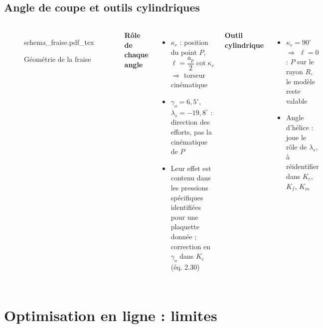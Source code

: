 \subsection*{Angle de coupe et outils cylindriques}
\begin{frame}

    \begin{columns}[c]
        \begin{figure}
            \centering
            {\fontsize{5pt}{5pt}\selectfont
                \def\svgwidth{\textwidth}
                {schema_fraise.pdf_tex}}
            \caption{Géométrie de la fraise}
        \end{figure}

        \textbf{Rôle de chaque angle}
        \begin{itemize}
            \item $\kappa_r$ : position du point $P$, $\ell = \dfrac{a_p}{2}\cot\kappa_r$ $\Rightarrow$ \alert{torseur cinématique}
            \item $\gamma_o = 6{,}5^\circ$, $\lambda_s = -19{,}8^\circ$ : \alert{direction des efforts}, pas la cinématique de $P$
            \item Leur effet est contenu dans les pressions spécifiques identifiées pour une plaquette donnée ; correction en $\gamma_o$ dans $K_c$ (éq. 2.30)
        \end{itemize}
        \textbf{Outil cylindrique}
        \begin{itemize}
            \item $\kappa_r = 90^\circ$ $\Rightarrow$ $\ell = 0$ : $P$ sur le rayon $R$, le modèle reste valable
            \item Angle d'hélice : joue le rôle de $\lambda_s$, à réidentifier dans $K_c$, $K_f$, $K_m$
        \end{itemize}
    \end{columns}
\end{frame}

\section{Optimisation en ligne : limites}

